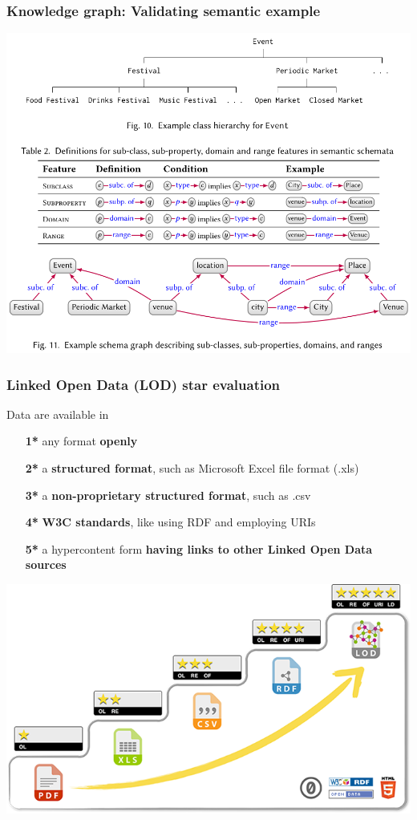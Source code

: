 \documentclass[10pt]{beamer}
\begin{document}
\begin{frame}
  \frametitle{Knowledge graph: Validating semantic example}
  \centering
  \includegraphics[width=0.9\linewidth]{verify-semantics.png}
\end{frame}


\def\textbfr#1{\textbf{{\color{red}#1*}}}

\begin{frame}
  \frametitle{Linked Open Data (LOD) star evaluation}
  Data are available in
  \begin{itemize}
  \item[\textbfr{1}] any format \textbf{openly}
  \item[\textbfr{2}] a \textbf{structured format}, such as Microsoft Excel file format (.xls)
  \item[\textbfr{3}] a \textbf{non-proprietary structured format}, such as .csv
  \item[\textbfr{4}] \textbf{W3C standards}, like using RDF and employing URIs
  \item[\textbfr{5}] a hypercontent form \textbf{having links to other Linked Open Data sources}
  \end{itemize}
  \begin{flushright}
   \includegraphics[width=0.7\linewidth]{5-star-lod.png}
  \end{flushright}
\end{frame}
\end{document}
